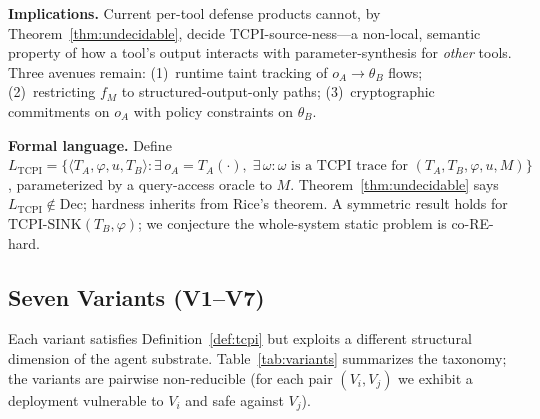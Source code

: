\documentclass[conference]{IEEEtran}
\begin{document}
\textbf{Implications.}  Current per-tool defense products cannot, by Theorem~\ref{thm:undecidable}, decide TCPI-source-ness---a non-local, semantic property of how a tool's output interacts with parameter-synthesis for \emph{other} tools.  Three avenues remain: (1)~runtime taint tracking of $o_A \to \theta_B$ flows; (2)~restricting $f_M$ to structured-output-only paths; (3)~cryptographic commitments on $o_A$ with policy constraints on $\theta_B$.

\textbf{Formal language.}  Define $L_{\mathrm{TCPI}} = \bigl\{\langle T_A, \varphi, u, T_B \rangle :
\exists\, o_A = T_A(\cdot), \;\exists\, \omega :
\omega \text{ is a TCPI trace for }
(T_A, T_B, \varphi, u, M)\bigr\}$,
parameterized by a query-access oracle to $M$.
Theorem~\ref{thm:undecidable} says $L_{\mathrm{TCPI}} \notin \mathrm{Dec}$; hardness inherits from Rice's theorem.
A symmetric result holds for $\mathrm{TCPI\text{-}SINK}(T_B, \varphi)$; we conjecture the whole-system static problem is co-RE-hard.


\subsection{Seven Variants (V1--V7)}
\label{sec:tcpi-variants}

Each variant satisfies Definition~\ref{def:tcpi} but exploits a
different structural dimension of the agent substrate.
Table~\ref{tab:variants} summarizes the taxonomy; the variants are
pairwise non-reducible (for each pair $(V_i, V_j)$ we exhibit a
deployment vulnerable to $V_i$ and safe against $V_j$).
\end{document}
